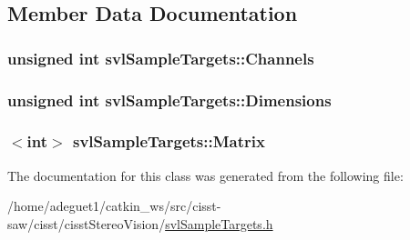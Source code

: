 \subsection{Member Data Documentation}
\hypertarget{classsvl_sample_targets_a2abdd733857b806aac8d3340dfb51c47}{
\subsubsection[{Channels}]{\setlength{\rightskip}{0pt plus 5cm}unsigned int svl\-Sample\-Targets\-::\-Channels\hspace{0.3cm}{\ttfamily [protected]}}}\label{classsvl_sample_targets_a2abdd733857b806aac8d3340dfb51c47}
\hypertarget{classsvl_sample_targets_aefc5e0137cd9dfee5611532f336610bf}{
\subsubsection[{Dimensions}]{\setlength{\rightskip}{0pt plus 5cm}unsigned int svl\-Sample\-Targets\-::\-Dimensions\hspace{0.3cm}{\ttfamily [protected]}}}\label{classsvl_sample_targets_aefc5e0137cd9dfee5611532f336610bf}
\hypertarget{classsvl_sample_targets_ae0bfb3f3979168e88f318894f4439764}{
\subsubsection[{Matrix}]{$<$int$>$ svl\-Sample\-Targets\-::\-Matrix\hspace{0.3cm}{\ttfamily [protected]}}}\label{classsvl_sample_targets_ae0bfb3f3979168e88f318894f4439764}


The documentation for this class was generated from the following file\-:\begin{DoxyCompactItemize}
\item 
/home/adeguet1/catkin\-\_\-ws/src/cisst-\/saw/cisst/cisst\-Stereo\-Vision/\hyperlink{svl_sample_targets_8h}{svl\-Sample\-Targets.\-h}\end{DoxyCompactItemize}
